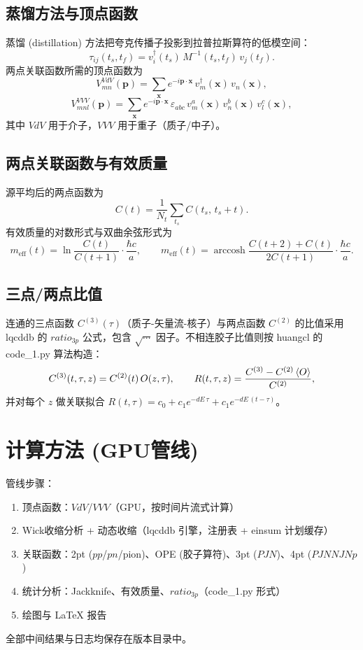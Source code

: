 \documentclass[11pt,a4paper]{article}
\newcommand{\meff}{m_{\mathrm{eff}}}
\newcommand{\Nt}{N_t}
\begin{document}
\subsection{蒸馏方法与顶点函数}
蒸馏 (distillation) 方法把夸克传播子投影到拉普拉斯算符的低模空间：
\[ \tau_{ij}(t_s,t_f) = v^\dagger_i(t_s)\, M^{-1}(t_s,t_f)\, v_j(t_f). \]
两点关联函数所需的顶点函数为
\begin{equation}
V^{VdV}_{mn}(\mathbf{p}) = \sum_{\mathbf{x}} e^{-i\mathbf{p}\cdot\mathbf{x}}\,
    v^\dagger_m(\mathbf{x})\, v_n(\mathbf{x}),
\label{eq:VdV}
\end{equation}
\begin{equation}
V^{VVV}_{m n l}(\mathbf{p}) = \sum_{\mathbf{x}} e^{-i\mathbf{p}\cdot\mathbf{x}}\,
    \varepsilon_{abc}\, v^a_m(\mathbf{x})\, v^b_n(\mathbf{x})\, v^c_l(\mathbf{x}),
\label{eq:VVV}
\end{equation}
其中 $VdV$ 用于介子，$VVV$ 用于重子（质子/中子）。

\subsection{两点关联函数与有效质量}
源平均后的两点函数为
\[ C(t) = \frac{1}{\Nt}\sum_{t_s} C(t_s,\, t_s + t). \]
有效质量的对数形式与双曲余弦形式为
\begin{equation}
\meff(t) = \ln\frac{C(t)}{C(t+1)}\cdot\frac{\hbar c}{a}, \qquad
\meff(t) = \operatorname{arccosh}\frac{C(t+2)+C(t)}{2C(t+1)}\cdot\frac{\hbar c}{a}.
\label{eq:meff}
\end{equation}

\subsection{三点/两点比值}
连通的三点函数 $C^{(3)}(\tau)$（质子-矢量流-核子）与两点函数 $C^{(2)}$ 的比值采用
lqcddb 的 $ratio_{3p}$ 公式，包含 $\sqrt{\cdots}$ 因子。不相连胶子比值则按
huangcl 的 code\_1.py 算法构造：
\begin{equation}
C^{(3)}(t, \tau, z) = C^{(2)}(t)\, O(z,\tau),
\qquad R(t,\tau,z) = \frac{C^{(3)} - C^{(2)}\braket{O}}{C^{(2)}},
\end{equation}
并对每个 $z$ 做关联拟合 $R(t,\tau) = c_0 + c_1 e^{-dE\,\tau} + c_1 e^{-dE\,(t-\tau)}$。

\section{计算方法 (GPU管线)}
管线步骤：
\begin{enumerate}
    \item 顶点函数：$VdV$/$VVV$（GPU，按时间片流式计算）
    \item Wick收缩分析 + 动态收缩（lqcddb 引擎，注册表 + einsum 计划缓存）
    \item 关联函数：2pt ($pp$/$pn$/pion)、OPE (胶子算符)、3pt ($PJN$)、4pt ($PJNNJNp$)
    \item 统计分析：Jackknife、有效质量、$ratio_{3p}$（code\_1.py 形式）
    \item 绘图与 LaTeX 报告
\end{enumerate}
全部中间结果与日志均保存在版本目录中。
\end{document}
